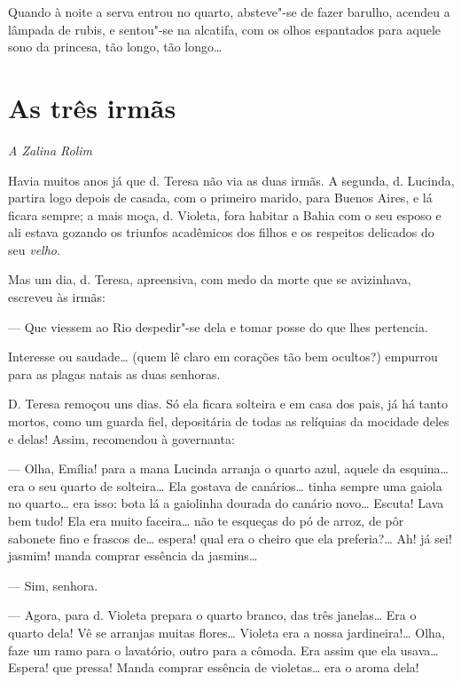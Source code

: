 Quando à noite a serva entrou no quarto, absteve"-se de fazer barulho,
acendeu a lâmpada de rubis, e sentou"-se na alcatifa, com os olhos
espantados para aquele sono da princesa, tão longo, tão longo\ldots{}

\chapter{As três irmãs}

\hfill{}\emph{A Zalina Rolim}

\bigskip

Havia muitos anos já que d. Teresa não via as duas irmãs. A segunda, d.
Lucinda, partira logo depois de casada, com o primeiro marido, para
Buenos Aires, e lá ficara sempre; a mais moça, d. Violeta, fora habitar
a Bahia com o seu esposo e ali estava gozando os triunfos acadêmicos dos
filhos e os respeitos delicados do seu \emph{velho}.

Mas um dia, d. Teresa, apreensiva, com medo da morte que se avizinhava,
escreveu às irmãs:

--- Que viessem ao Rio despedir"-se dela e tomar posse do que lhes
pertencia.

Interesse ou saudade\ldots{} (quem lê claro em corações tão bem ocultos?)
empurrou para as plagas natais as duas senhoras.

D. Teresa remoçou uns dias. Só ela ficara solteira e em casa dos pais,
já há tanto mortos, como um guarda fiel, depositária de todas as
relíquias da mocidade deles e delas! Assim, recomendou à governanta:

--- Olha, Emília! para a mana Lucinda arranja o quarto azul, aquele da
esquina\ldots{} era o seu quarto de solteira\ldots{} Ela gostava de canários\ldots{}
tinha sempre uma gaiola no quarto\ldots{} era isso: bota lá a gaiolinha
dourada do canário novo\ldots{} Escuta! Lava bem tudo! Ela era muito
faceira\ldots{} não te esqueças do pó de arroz, de pôr sabonete fino e
frascos de\ldots{} espera! qual era o cheiro que ela preferia?\ldots{} Ah! já sei!
jasmim! manda comprar essência da jasmins\ldots{}

--- Sim, senhora.

--- Agora, para d. Violeta prepara o quarto branco, das três janelas\ldots{}
Era o quarto dela! Vê se arranjas muitas flores\ldots{} Violeta era a nossa
jardineira!\ldots{} Olha, faze um ramo para o lavatório, outro para a cômoda.
Era assim que ela usava\ldots{} Espera! que pressa! Manda comprar essência de
violetas\ldots{} era o aroma dela!

